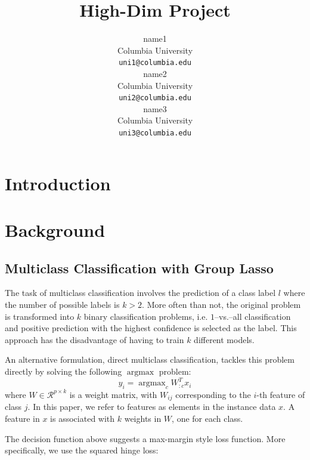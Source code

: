 \documentclass[11pt]{article}
\title{High-Dim Project}
\author{name1 \\
  Columbia University\\
  {\small \tt uni1@columbia.edu} \\\And
  name2 \\
  Columbia University\\
  {\small \tt uni2@columbia.edu} \\\And
  name3\\
  Columbia University\\
  {\small \tt uni3@columbia.edu} \\}
\date{}
\begin{document}
\maketitle

\section{Introduction}

\section{Background}


\subsection{Multiclass Classification with Group Lasso}

The task of multiclass classification involves the prediction of a class label
$l$ where the number of possible labels is $k>2$. More often than not, the 
original problem is transformed into $k$ binary classification problems, i.e.
$1$--vs.--all classification and positive prediction with the highest 
confidence is selected as the label. This approach has the disadvantage of
having to train $k$ different models.

An alternative formulation, direct multiclass classification, tackles this 
problem directly by solving the following $\operatorname{argmax}$ problem:
$$y_i = \operatorname{argmax}_c W_{:c}^T x_i $$
where $W \in \mathcal{R}^{p \times k}$ is a weight matrix, with $W_{ij}$
corresponding to the $i$-th feature of class $j$. In this paper, we refer
to features as elements in the instance data $x$. A feature in $x$ is
associated with $k$ weights in $W$, one for each class.


The decision function above suggests a max-margin style loss function. More
specifically, we use the squared hinge loss:
\end{document}
